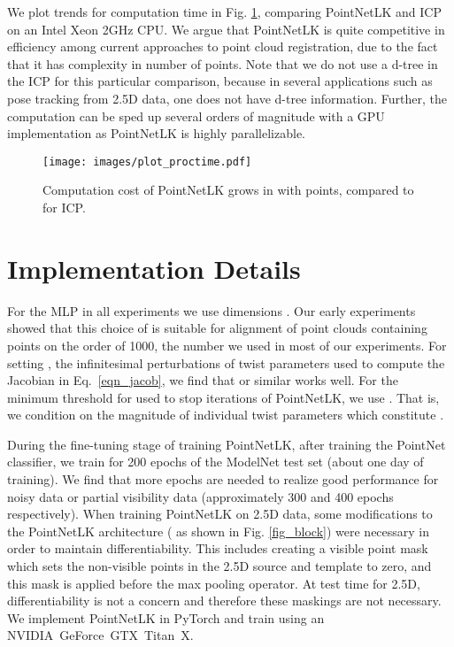 \documentclass[10pt,twocolumn,letterpaper]{article}
\begin{document}
We plot trends for computation time in Fig. \ref{fig_NumPoints}, comparing PointNetLK and ICP on an Intel Xeon 2GHz CPU. We argue that PointNetLK is quite competitive in efficiency among current approaches to point cloud registration, due to the fact that it has complexity  in  number of points. Note that we do not use a d-tree in the ICP for this particular comparison, because in several applications such as pose tracking from 2.5D data, one does not have d-tree information. Further, the computation can be sped up several orders of magnitude with a GPU implementation as PointNetLK is highly parallelizable.

\begin{figure}[htbp]
\centering 
\texttt{[image: images/plot\_proctime.pdf]}
\caption{Computation cost of PointNetLK grows in  with  points, compared to  for ICP.}
\label{fig_NumPoints}
\end{figure}
\section{Implementation Details}

For the MLP in all experiments we use dimensions . Our early experiments showed that this choice of  is suitable for alignment of point clouds containing points on the order of 1000, the number we used in most of our experiments. For setting , the infinitesimal perturbations of twist parameters used to compute the Jacobian in Eq.~\ref{eqn_jacob}, we find that  or similar works well. For the minimum threshold for  used to stop iterations of PointNetLK, we use . That is, we condition on the magnitude of individual twist parameters which constitute .

During the fine-tuning stage of training PointNetLK, after training the PointNet classifier, we train for 200 epochs of the ModelNet test set (about one day of training). We find that more epochs are needed to realize good performance for noisy data or partial visibility data (approximately 300 and 400 epochs respectively). When training PointNetLK on 2.5D data, some modifications to the PointNetLK architecture ( as shown in Fig. \ref{fig_block}) were necessary in order to maintain differentiability. This includes creating a visible point mask which sets the non-visible points in the 2.5D source and template to zero, and this mask is applied before the max pooling operator. At test time for 2.5D, differentiability is not a concern and therefore these maskings are not necessary. We implement PointNetLK in PyTorch and train using an \mbox{NVIDIA GeForce GTX Titan X}.
\end{document}
